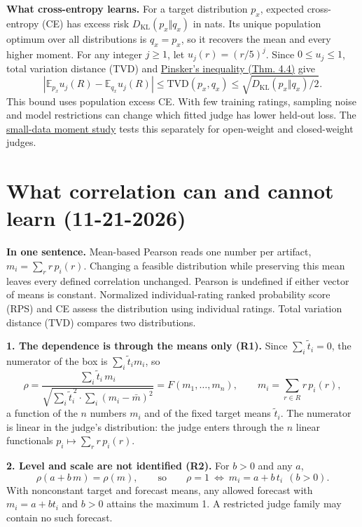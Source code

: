 \documentclass[11pt]{article}
\newcommand{\ttil}{\tilde t}
\begin{document}
\textbf{What cross-entropy learns.} For a target distribution $p_x$, expected cross-entropy (CE)
has excess risk $D_{\mathrm{KL}}(p_x\Vert q_x)$ in nats. Its unique population optimum over all
distributions is $q_x=p_x$, so it recovers the mean and every higher moment. For any
integer $j\ge 1$, let $u_j(r)=(r/5)^j$. Since $0\le u_j\le1$, total variation distance (TVD)
and \href{https://www.stat.yale.edu/\string~yw562/teaching/598/lec04.pdf}{Pinsker’s inequality (Thm. 4.4)} give
\[
\left|\mathbb E_{p_x}u_j(R)-\mathbb E_{q_x}u_j(R)\right|
\le \mathrm{TVD}(p_x,q_x)\le\sqrt{D_{\mathrm{KL}}(p_x\Vert q_x)/2}.
\]
This bound uses population excess CE. With few training ratings, sampling noise and model
restrictions can change which fitted judge has lower held-out loss.
The \href{https://github.com/brando90/judges-dont-need-psychometrics-or-corr/tree/main/experiments/19_small_data_moment_recovery_open_and_closed_judges_start_21Nov2026}{small-data moment study} tests this separately for open-weight and closed-weight judges.

\section*{What correlation can and cannot learn (11-21-2026)}
\textbf{In one sentence.} Mean-based Pearson reads one number per artifact, $m_i=\sum_r r\,p_i(r)$. Changing a feasible distribution while preserving this mean leaves every defined correlation unchanged. Pearson is undefined if either vector of means is constant. Normalized individual-rating ranked probability score (RPS) and CE assess the distribution using individual ratings. Total variation distance (TVD) compares two distributions.

\textbf{1. The dependence is through the means only (R1).} Since $\sum_i\ttil_i=0$, the numerator of the box is $\sum_i\ttil_i m_i$, so
\[
\rho=\frac{\sum_i\ttil_i\,m_i}{\sqrt{\sum_i\ttil_i^{\,2}\cdot\sum_i(m_i-\bar m)^2}}=F(m_1,\dots,m_n),\qquad m_i=\sum_{r\in R} r\,p_i(r),
\]
a function of the $n$ numbers $m_i$ and of the fixed target means $\ttil_i$. The numerator is linear in the judge's distribution: the judge enters through the $n$ linear functionals $p_i\mapsto\sum_r r\,p_i(r)$.

\textbf{2. Level and scale are not identified (R2).} For $b>0$ and any $a$,
\[
\rho(a+b\,m)=\rho(m),\qquad\text{so}\qquad \rho=1\ \Longleftrightarrow\ m_i=a+b\,t_i\ \ (b>0).
\]
With nonconstant target and forecast means, any allowed forecast with $m_i=a+bt_i$ and $b>0$ attains the maximum 1. A restricted judge family may contain no such forecast.
\end{document}

